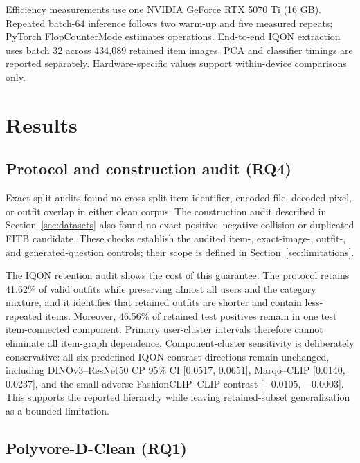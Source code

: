 \documentclass[preprint,12pt]{elsarticle}
\begin{document}
Efficiency measurements use one NVIDIA GeForce RTX 5070 Ti (16 GB). Repeated batch-64 inference follows two warm-up and five measured repeats; PyTorch FlopCounterMode estimates operations. End-to-end IQON extraction uses batch 32 across 434,089 retained item images. PCA and classifier timings are reported separately. Hardware-specific values support within-device comparisons only.

\section{Results}\label{sec:results}

\subsection{Protocol and construction audit (RQ4)}\label{sec:protocolaudit}

Exact split audits found no cross-split item identifier, encoded-file, decoded-pixel, or outfit overlap in either clean corpus. The construction audit described in Section~\ref{sec:datasets} also found no exact positive--negative collision or duplicated FITB candidate. These checks establish the audited item-, exact-image-, outfit-, and generated-question controls; their scope is defined in Section~\ref{sec:limitations}.

The IQON retention audit shows the cost of this guarantee. The protocol retains 41.62\% of valid outfits while preserving almost all users and the category mixture, and it identifies that retained outfits are shorter and contain less-repeated items. Moreover, 46.56\% of retained test positives remain in one test item-connected component. Primary user-cluster intervals therefore cannot eliminate all item-graph dependence. Component-cluster sensitivity is deliberately conservative: all six predefined IQON contrast directions remain unchanged, including DINOv3--ResNet50 CP 95\% CI [0.0517, 0.0651], Marqo--CLIP [0.0140, 0.0237], and the small adverse FashionCLIP--CLIP contrast [$-0.0105$, $-0.0003$]. This supports the reported hierarchy while leaving retained-subset generalization as a bounded limitation.

\subsection{Polyvore-D-Clean (RQ1)}\label{sec:poly}
\end{document}
